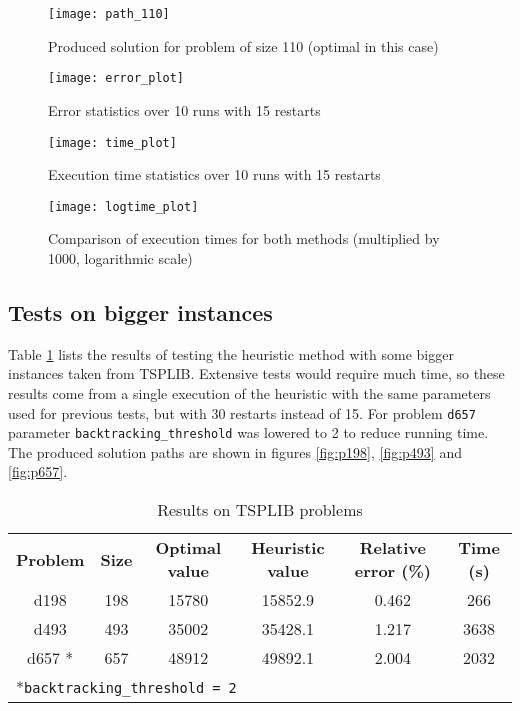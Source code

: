 

\begin{figure}[H]
	\centering
	\texttt{[image: path\_110]}
	\caption{Produced solution for problem of size 110 (optimal in this case)}
	\label{fig:path110}
\end{figure}

\begin{figure}[H]
	\centering
	\texttt{[image: error\_plot]}
	\caption{Error statistics over 10 runs with 15 restarts}
	\label{fig:ploterr}
\end{figure}

\begin{figure}[H]
	\centering
	\texttt{[image: time\_plot]}
	\caption{Execution time statistics over 10 runs with 15 restarts}
	\label{fig:plotime}
\end{figure}

\begin{figure}[H]
	\centering
	\texttt{[image: logtime\_plot]}
	\caption{Comparison of execution times for both methods (multiplied by 1000, logarithmic scale)}
	\label{fig:logtime}
\end{figure}

\subsection{Tests on bigger instances}
Table \ref{tab:tsplibr} lists the results of testing the heuristic method with some bigger instances taken from TSPLIB. Extensive tests would require much time, so these results come from a single execution of the heuristic with the same parameters used for previous tests, but with 30 restarts instead of 15. For problem \texttt{d657} parameter \texttt{backtracking\_threshold} was lowered to 2 to reduce running time.  The produced solution paths are shown in figures \ref{fig:p198}, \ref{fig:p493} and \ref{fig:p657}.

\begin{table}[h]
	\caption{Results on TSPLIB problems}
	\label{tab:tsplibr}
	\centering
	\begin{tabular}[t]{cccccc}
		\rowcolor[HTML]{EFEFEF}
		\textbf{Problem} & \textbf{Size} & \textbf{Optimal value} & \textbf{Heuristic value} & \textbf{Relative error (\%)} & \textbf{Time (s)} \\
		d198    & 198 & 15780 & 15852.9 & 0.462  & 266   \\
		d493    & 493 & 35002 & 35428.1 & 1.217 & 3638	\\
		d657 *	& 657 & 48912 & 49892.1 & 2.004	&  2032 \\
		\multicolumn{6}{l}{\rule{0pt}{4ex}*\texttt{backtracking\_threshold = 2}} 
	\end{tabular}
\end{table}

